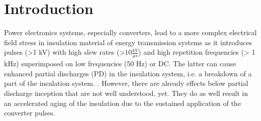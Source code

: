 
\chapter{Introduction}
Power electronics systems, especially converters, lead to a more complex electrical field stress in insulation material of energy transmission systems as it introduces pulses (>1 kV) with high slew rates (>$10 \frac{kV}{\mu s}$) and high repetition frequencies (> 1 kHz) superimposed on low frequencies (50 Hz) or DC. The latter can cause enhanced partial discharges (PD) in the insulation system, i.e. a breakdown of a part of the insulation system. \cite{TransformerEngineering}. However, there are already effects below partial discharge inception that are not well understood, yet. They do as well result in an accelerated aging of the insulation due to the sustained application of the converter pulses. 
\newline


